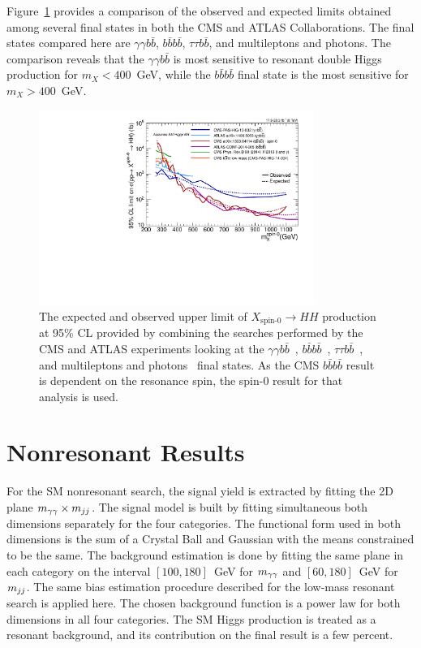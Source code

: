 Figure~\ref{fig:limit_comp} provides a comparison of the observed and expected limits obtained
among several final states in both the CMS and ATLAS Collaborations. The final states compared here
are $\gamma \gamma b\bar{b}$, $b\bar{b}b\bar{b}$, $\tau\tau b\bar{b}$, and multileptons and photons.
The comparison reveals that the $\gamma \gamma b\bar{b}$ is most sensitive to resonant double
Higgs production for $m_X < 400$~GeV, while the $b\bar{b}b\bar{b}$ final state is the most sensitive
for $m_X > 400$~GeV.


\begin{figure}[ht]
 \begin{center}
   \includegraphics[width=0.8\textwidth]{figures/results/limit_comparison_all.pdf}
 \end{center}
\caption{The expected and observed upper limit of $X_\text{spin-0} \rightarrow HH$ production
at 95\% CL provided by combining the searches performed by the CMS and ATLAS experiments
looking at the $\gamma \gamma b\bar{b}$~\cite{CMS-PAS-HIG-13-032,Aad:2014yja},
$b\bar{b}b\bar{b}$~\cite{Khachatryan:2015yea,ATLAS-CONF-2014-005},
$\tau\tau b\bar{b}$~\cite{CMS-PAS-HIG-14-034}, and
multileptons and photons~\cite{PhysRevD.90.112013}
final states. As the CMS $b\bar{b}b\bar{b}$ result is dependent on the
resonance spin, the spin-0 result for that analysis is used.}
\label{fig:limit_comp}
\end{figure}


\section{Nonresonant Results\label{sec:nonresresults}}

For the SM nonresonant search, the signal yield is extracted by fitting the 2D plane
$m_{\gamma\gamma} \times m_{jj}$. The signal model is built by fitting simultaneous both dimensions separately
for the four categories. The functional form used in both dimensions is the sum of a Crystal Ball and
Gaussian with the means constrained to be the same. The background estimation is done by fitting
the same plane in each category on the interval $[100, 180]$~GeV for $m_{\gamma\gamma}$ and $[60, 180]$~GeV
for $m_{jj}$. The same bias estimation procedure
described for the low-mass resonant search is applied here. The chosen background function is a power
law for both dimensions in all four categories. The SM Higgs production is treated as a resonant
background, and its contribution on the final result is a few percent.

